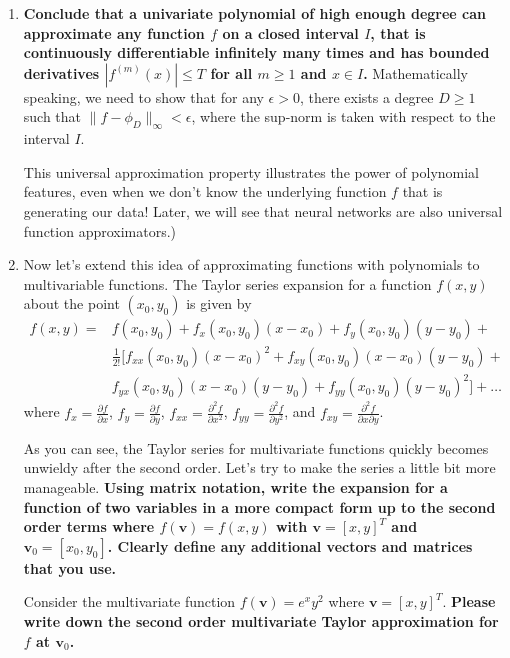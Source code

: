 \documentclass{article}\usepackage[utf8]{inputenc}\usepackage[margin=0.4cm,top=0.4cm,bottom=0.4cm]{geometry}\usepackage[usenames,dvipsnames,svgnames,table]{xcolor}
\begin{document}
\begin{enumerate}
\EndSolution
\item \textbf{Conclude that a univariate polynomial of high enough degree can approximate any function $f$ on a closed interval $I$, that is continuously differentiable infinitely many times and has bounded derivatives $|f^{(m)}(x)|\leqslant T$ for all $m\geqslant 1$ and $x\in I$.} Mathematically speaking, we need to show that for any $\epsilon > 0$, there exists a degree $D \geqslant 1$ such that $\|f-\phi_D\|_{\infty} < \epsilon$, where the sup-norm is taken with respect to the interval $I$.
\vspace{4pt}

This universal approximation property illustrates the power of polynomial features, even when we don't know the underlying function $f$ that is generating our data! Later, we will see that neural networks are also universal function approximators.)
\BeginSolution

\EndSolution
\item Now let's extend this idea of approximating functions with polynomials to multivariable functions.  The Taylor series expansion for a function $f(x,y)$ about the point $(x_0,y_0)$ is given by \begin{align*} f(x,y) = &f(x_0,y_0)+f_x(x_0,y_0)(x-x_0)+f_y(x_0,y_0)(y-y_0)+\\&\frac{1}{2!}[f_{xx}(x_0,y_0)(x-x_0)^2+f_{xy}(x_0,y_0)(x-x_0)(y-y_0)+\\&f_{yx}(x_0,y_0)(x-x_0)(y-y_0)+f_{yy}(x_0,y_0)(y-y_0)^2]+\ldots\tag{4}\end{align*} where $f_x=\frac{\partial f}{\partial x}$, $f_y=\frac{\partial f}{\partial y}$, $f_{xx}=\frac{\partial^2f}{\partial x^2}$, $f_{yy}=\frac{\partial^2f}{\partial y^2}$, and $f_{xy}=\frac{\partial^2f}{\partial x \partial y}$.
\vspace{4pt}

As you can see, the Taylor series for multivariate functions quickly becomes unwieldy after the second order.  Let's try to make the series a little bit more manageable. \textbf{Using matrix notation, write the expansion for a function of two variables in a more compact form up to the second order terms where $f(\mathbf{v})=f(x,y)$ with $\mathbf{v}=[x,y]^T$ and $\mathbf{v}_0=[x_0,y_0]$.  Clearly define any additional vectors and matrices that you use.}
\vspace{4pt}

Consider the multivariate function $f(\mathbf{v})=e^{x}y^2$ where $\mathbf{v}=[x,y]^T$. \textbf{Please write down the second order multivariate Taylor approximation for $f$ at $\mathbf{v}_0$.}
\BeginSolution


\end{enumerate}
\end{document}
